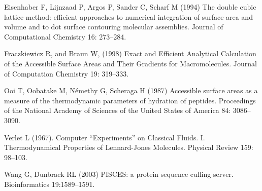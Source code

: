 \documentclass[a4paper,11pt]{article}
\begin{document}
\begin{small}
\begin{thebibliography}{50}
  Eisenhaber F, Lijnzaad P, Argos P, Sander C, Scharf M (1994)
  The double cubic lattice method: efficient approaches to numerical
  integration of surface area and volume and to dot surface contouring
  molecular assemblies. Journal of Computational Chemistry 16: 273--284.

  Fraczkiewicz R, and Braun W, (1998) Exact and Efficient Analytical
  Calculation of the Accessible Surface Areas and Their Gradients for
  Macromolecules. Journal of Computation Chemistry 19: 319--333.

  Ooi T, Oobatake M, Némethy G, Scheraga H (1987)
  Accessible surface areas as a measure of the thermodynamic
  parameters of hydration of peptides. Proceedings of the National
  Academy of Sciences of the United States of America 84: 3086–3090.

  Verlet L (1967). Computer ``Experiments'' on Classical
  Fluids. I. Thermodynamical Properties of Lennard-Jones
  Molecules. Physical Review 159: 98--103.

  Wang G, Dunbrack RL (2003) PISCES: a protein sequence culling server. 
  Bioinformatics 19:1589--1591.

\end{thebibliography}

\end{small}
\end{document}
